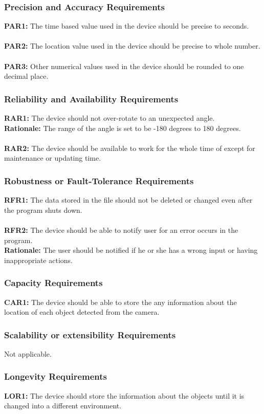 \documentclass[12pt]{article}
\begin{document}
\subsubsection{Precision and Accuracy Requirements}
\textbf{PAR1:} The time based value used in the device should be precise to seconds.\\\\
\textbf{PAR2:} The location value used in the device should be precise to whole number.\\\\
\textbf{PAR3:} Other numerical values used in the device should be rounded to one decimal place.
\subsubsection{Reliability and Availability Requirements}
\textbf{RAR1:} The device should not over-rotate to an unexpected angle.\\
\textbf{Rationale:} The range of the angle is set to be -180 degrees to 180 degrees.\\\\
\textbf{RAR2:} The device should be available to work for the whole time of except for maintenance or updating time.
\subsubsection{Robustness or Fault-Tolerance Requirements}
\textbf{RFR1:} The data stored in the file should not be deleted or changed even after the program shuts down.\\\\
\textbf{RFR2:} The device should be able to notify user for an error occurs in the program.\\
\textbf{Rationale:} The user should be notified if he or she has a wrong input or having inappropriate actions.
\subsubsection{Capacity Requirements}
\textbf{CAR1:} The device should be able to store the any information about the location of each object detected from the camera.
\subsubsection{Scalability or extensibility Requirements}
Not applicable.
\subsubsection{Longevity Requirements}
\textbf{LOR1:} The device should store the information about the objects until it is changed into a different environment.
\end{document}
